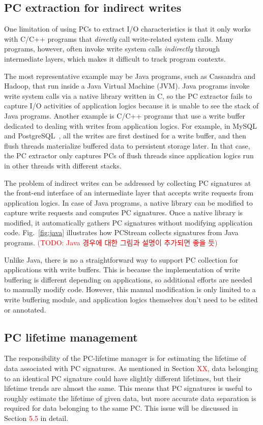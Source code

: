 \subsection{PC extraction for indirect writes}
One limitation of using PCs to extract I/O characteristics is that it only
works with C/C++ programs that \textit{directly} call write-related system
calls.  Many programs, however, often invoke write system calls
\textit{indirectly} through intermediate layers, which makes it difficult to
track program contexts.

The most representative example may be Java programs, such as Cassandra and
Hadoop, that run inside a Java Virtual Machine (JVM). Java programs invoke
write system calls via a native library written in C, so the PC extractor fails
to capture I/O activities of application logics because it is unable to see the
stack of Java programs.  Another example is C/C++ programs that use a write
buffer dedicated to dealing with writes from application logics. For example,
in MySQL~\cite{ref} and PostgreSQL~\cite{ref}, all the writes are first
destined for a write buffer, and then flush threads materialize buffered data
to persistent storage later.  In that case, the PC extractor only captures PCs
of flush threads since application logics run in other threads with different
stacks.

The problem of indirect writes can be addressed by collecting PC signatures at
the front-end interface of an intermediate layer that accepts write requests
from application logics. In case of Java programs, a native library can be
modified to capture write requests and computes PC signatures. Once a native
library is modified, it automatically gathers PC signatures without modifying
application code. Fig.~\ref{fig:java} illustrates how \textsf{PCStream}
collects signatures from Java programs.  \textcolor{red}{(TODO: Java 경우에
대한 그림과 설명이 추가되면 좋을 듯)}

Unlike Java, there is no a straightforward way to support PC collection for
applications with write buffers. This is because the implementation of write
buffering is different depending on applications, so additional efforts are
needed to manually modify code. However, this manual modification is only
limited to a write buffering module, and application logics themselves don't
need to be edited or annotated.

\subsection{PC lifetime management}
The responsibility of the PC-lifetime manager is for estimating the lifetime of
data associated with PC signatures. As mentioned in Section
\textcolor{red}{XX}, data belonging to an identical PC signature could have
slightly different lifetimes, but their lifetime trends are almost the same.
This means that PC signatures is useful to roughly estimate the lifetime of
given data, but more accurate data separation is required for data belonging to
the same PC.  This issue will be discussed in Section \textcolor{red}{5.5} in
detail.


